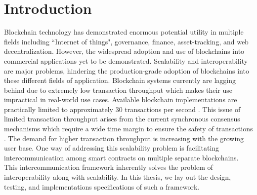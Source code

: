 \documentclass[a4paper,twoside,phd]{BYUPhys}
\begin{document}
 \frontmatter


 \makepreliminarypages


\doublespace
%

%

 \clearemptydoublepage
\singlespace
 \tableofcontents

\clearemptydoublepage
\listoffigures

\clearemptydoublepage
\listoftables

\clearemptydoublepage

\mainmatter
%
\chapter{Introduction}
\label{chap:Introduction}
Blockchain technology has demonstrated enormous potential utility in multiple fields including ``Internet of things", governance, finance, asset-tracking, and web decentralization. However, the widespread adoption and use of blockchains into commercial applications yet to be demonstrated.\cite{GavinWood2018POLKADOT:FRAMEWORK}
 Scalability and interoperability are major problems, hindering the production-grade adoption of blockchains into these different fields of application.\cite{TheZilliqaTeam2017TheWhitepaper} Blockchain systems currently are lagging behind due to extremely low transaction throughput which makes their use impractical in real-world use cases\cite{GavinWood2018POLKADOT:FRAMEWORK}. Available blockchain implementations are practically limited to approximately 30 transactions per second \cite{GavinWood2018POLKADOT:FRAMEWORK}. This issue of limited transaction throughput arises from the current synchronous consensus mechanisms which require a wide time margin to ensure the safety of transactions \cite{GavinWood2018POLKADOT:FRAMEWORK}. The demand for higher transaction throughput is increasing with the growing user base\cite{Croman2016OnBlockchains}. One way of addressing this scalability problem is facilitating intercommunication among smart contracts on multiple separate blockchains\cite{Kwon2018ALedgers}. This intercommunication framework inherently solves the problem of interoperability along with scalability. In this thesis, we lay out the design, testing, and implementations specifications of such a framework.
 
\end{document}
